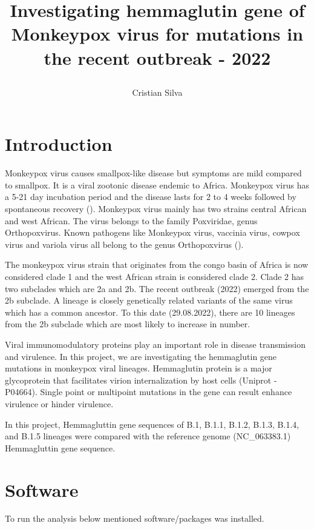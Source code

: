 \documentclass[fleqn,10pt]{olplainarticle}
\title{Investigating  hemmaglutin gene of Monkeypox virus for mutations in the recent outbreak - 2022

}
\author[1]{Cristian Silva}
\affil[1]{DreamSpace Academy Bio Lab, Batticaloa}
\begin{document}
\flushbottom
\maketitle
\thispagestyle{empty}

\section*{Introduction}

Monkeypox virus causes smallpox-like disease but symptoms are mild compared to smallpox. It is a viral zootonic disease endemic to Africa. Monkeypox virus has a 5-21 day incubation period and the disease lasts for 2 to 4 weeks followed by spontaneous recovery (\cite{a2022outbreak}). Monkeypox virus mainly has two strains central African and west African. The virus belongs to the family Poxviridae, genus Orthopoxvirus. Known pathogens like Monkeypox virus, vaccinia virus, cowpox virus and variola virus all belong to the genus Orthopoxvirus (\cite{kugelman2014genomic}). 

The monkeypox virus strain that originates from the congo basin of Africa is now considered clade 1 and the west African strain is considered clade 2.  Clade 2 has two subclades which are 2a and 2b. The recent outbreak (2022) emerged from the 2b subclade. A lineage is closely genetically related variants of the same virus which has a common ancestor. To this date (29.08.2022), there are 10 lineages from the 2b subclade which are most likely to increase in number. 

Viral immunomodulatory proteins play an important role in disease transmission and virulence. In this project, we are investigating the hemmaglutin gene mutations in monkeypox viral lineages. Hemmaglutin protein is a major glycoprotein that facilitates virion internalization by host cells (Uniprot - P04664). Single point or multipoint mutations in the gene can result enhance virulence or hinder virulence.

In this project,  Hemmagluttin gene sequences of B.1, B.1.1, B.1.2, B.1.3, B.1.4, and B.1.5 lineages were compared with the reference genome (NC\_063383.1) Hemmagluttin gene sequence. 




\section*{Software}

To run the analysis below mentioned software/packages was installed.
\end{document}
